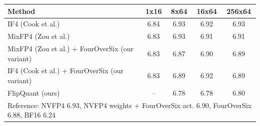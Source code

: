 \begin{tabular}{lcccc}
\toprule
Method & 1x16 & 8x64 & 16x64 & 256x64 \\
\midrule
IF4 (Cook et al.) & 6.84 & 6.93 & 6.92 & 6.93 \\
MixFP4 (Zou et al.) & 6.83 & 6.93 & 6.91 & 6.91 \\
MixFP4 (Zou et al.) + FourOverSix (our variant) & 6.83 & 6.87 & 6.90 & 6.89 \\
IF4 (Cook et al.) + FourOverSix (our variant) & 6.83 & 6.89 & 6.92 & 6.89 \\
FlipQuant (ours) & -- & 6.78 & 6.78 & 6.80 \\
\midrule
\multicolumn{5}{l}{\footnotesize Reference: NVFP4 6.93, NVFP4 weights + FourOverSix act. 6.90, FourOverSix 6.88, BF16 6.24} \\
\bottomrule
\end{tabular}
